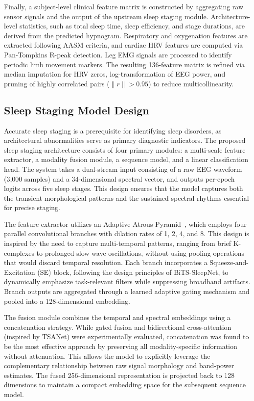 Finally, a subject-level clinical feature matrix is constructed by aggregating raw sensor signals and the output of the upstream sleep staging module. Architecture-level statistics, such as total sleep time, sleep efficiency, and stage durations, are derived from the predicted hypnogram. Respiratory and oxygenation features are extracted following AASM criteria, and cardiac HRV features are computed via Pan-Tompkins R-peak detection. Leg EMG signals are processed to identify periodic limb movement markers. The resulting 136-feature matrix is refined via median imputation for HRV zeros, log-transformation of EEG power, and pruning of highly correlated pairs ($\|r\| > 0.95$) to reduce multicollinearity.

\subsection{Sleep Staging Model Design}

Accurate sleep staging is a prerequisite for identifying sleep disorders, as architectural abnormalities serve as primary diagnostic indicators. The proposed sleep staging architecture consists of four primary modules: a multi-scale feature extractor, a modality fusion module, a sequence model, and a linear classification head. The system takes a dual-stream input consisting of a raw EEG waveform (3,000 samples) and a 34-dimensional spectral vector, and outputs per-epoch logits across five sleep stages. This design ensures that the model captures both the transient morphological patterns and the sustained spectral rhythms essential for precise staging.

The feature extractor utilizes an Adaptive Atrous Pyramid~\cite{sun2025adg}, which employs four parallel convolutional branches with dilation rates of 1, 2, 4, and 8. This design is inspired by the need to capture multi-temporal patterns, ranging from brief K-complexes to prolonged slow-wave oscillations, without using pooling operations that would discard temporal resolution. Each branch incorporates a Squeeze-and-Excitation (SE) block, following the design principles of BiTS-SleepNet, to dynamically emphasize task-relevant filters while suppressing broadband artifacts. Branch outputs are aggregated through a learned adaptive gating mechanism and pooled into a 128-dimensional embedding.

The fusion module combines the temporal and spectral embeddings using a concatenation strategy. While gated fusion and bidirectional cross-attention (inspired by TSANet) were experimentally evaluated, concatenation was found to be the most effective approach by preserving all modality-specific information without attenuation. This allows the model to explicitly leverage the complementary relationship between raw signal morphology and band-power estimates. The fused 256-dimensional representation is projected back to 128 dimensions to maintain a compact embedding space for the subsequent sequence model.

